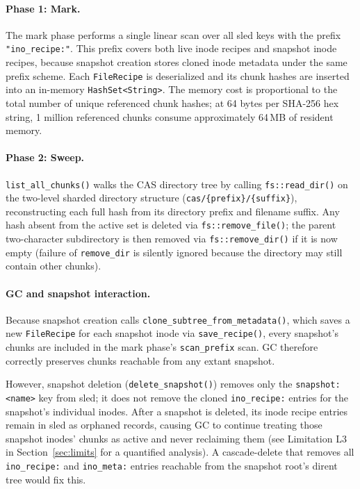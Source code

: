 \documentclass[journal]{IEEEtran}
\begin{document}
\paragraph{Phase 1: Mark.}
The mark phase performs a single linear scan over all sled keys with the
prefix \texttt{"ino\_recipe:"}.  This prefix covers both live inode
recipes and snapshot inode recipes, because snapshot creation stores
cloned inode metadata under the same prefix scheme.  Each
\texttt{FileRecipe} is deserialized and its chunk hashes are inserted
into an in-memory \texttt{HashSet\textless{}String\textgreater{}}.  The
memory cost is proportional to the total number of unique referenced
chunk hashes; at 64 bytes per SHA-256 hex string, 1 million referenced
chunks consume approximately 64\,MB of resident memory.

\paragraph{Phase 2: Sweep.}
\texttt{list\_all\_chunks()} walks the CAS directory tree by calling
\texttt{fs::read\_dir()} on the two-level sharded directory structure
(\texttt{cas/\{prefix\}/\{suffix\}}), reconstructing each full hash
from its directory prefix and filename suffix.  Any hash absent from
the active set is deleted via \texttt{fs::remove\_file()}; the parent
two-character subdirectory is then removed via \texttt{fs::remove\_dir()}
if it is now empty (failure of \texttt{remove\_dir} is silently ignored
because the directory may still contain other chunks).

\paragraph{GC and snapshot interaction.}
Because snapshot creation calls \texttt{clone\_subtree\_from\_metadata()},
which saves a new \texttt{FileRecipe} for each snapshot inode via
\texttt{save\_recipe()}, every snapshot's chunks are included in the
mark phase's \texttt{scan\_prefix} scan.  GC therefore correctly
preserves chunks reachable from any extant snapshot.

However, snapshot deletion (\texttt{delete\_snapshot()}) removes only
the \texttt{snapshot:\textless{}name\textgreater{}} key from sled; it
does not remove the cloned \texttt{ino\_recipe:} entries for the
snapshot's individual inodes.  After a snapshot is deleted, its inode
recipe entries remain in sled as orphaned records, causing GC to continue
treating those snapshot inodes' chunks as active and never reclaiming them
(see Limitation L3 in Section~\ref{sec:limits} for a quantified analysis).
A cascade-delete that removes all \texttt{ino\_recipe:} and
\texttt{ino\_meta:} entries reachable from the snapshot root's dirent tree
would fix this.
\end{document}
